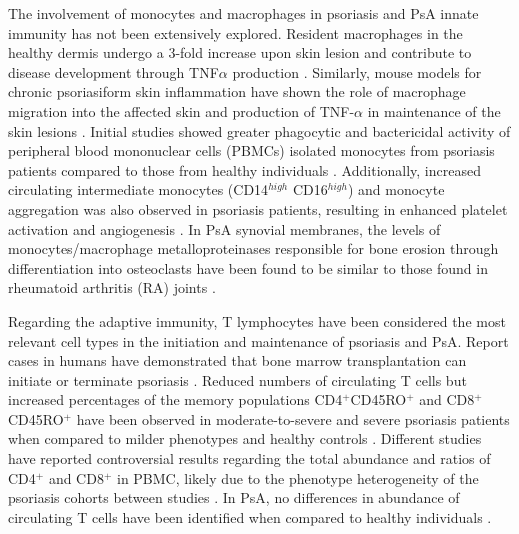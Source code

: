 %
%


The involvement of monocytes and macrophages in psoriasis and PsA innate immunity has not been extensively explored. Resident macrophages in the healthy dermis undergo a 3-fold increase upon skin lesion and contribute to disease development through TNF$\alpha$ production \parencite{Perera2012, Mahil2016}. Similarly, mouse models for chronic psoriasiform skin inflammation have shown the role of macrophage migration into the affected skin and production of TNF-$\alpha$ in maintenance of the skin lesions \parencite{Stratis2006, Wang2006}. Initial studies showed greater phagocytic and bactericidal activity of peripheral blood mononuclear cells (PBMCs) isolated monocytes from psoriasis patients compared to those from healthy individuals \parencite{Bar-Eli1979}. Additionally, increased circulating intermediate monocytes (CD14$^{high}$ CD16$^{high}$) and monocyte aggregation was also observed in psoriasis patients, resulting in enhanced platelet activation and angiogenesis \parencite {Golden2015}. In PsA synovial membranes, the levels of monocytes/macrophage metalloproteinases responsible for bone erosion through differentiation into osteoclasts  have been found to be similar to those found in rheumatoid arthritis (RA) joints \parencite{Hitchon2002}. 

Regarding the adaptive immunity, T lymphocytes have been considered the most relevant cell types in the initiation and maintenance of psoriasis and PsA. Report cases in humans have demonstrated that bone marrow transplantation can initiate or terminate psoriasis \parencite{Eedy1990, Gardembas1990}. Reduced numbers of circulating T cells but increased percentages of the memory populations CD4$^+$CD45RO$^+$ and CD8$^+$CD45RO$^+$ have been observed in moderate-to-severe and severe psoriasis patients when compared to milder phenotypes and healthy controls \parencite{Lecewicz-Toruń2001,Langewouters2008}. Different studies have reported controversial results regarding the total abundance and ratios of CD4$^+$ and CD8$^{+}$ in PBMC, likely due to the phenotype heterogeneity of the psoriasis cohorts between studies \parencite{Lecewicz-Toruń2001,Cameron2003,Langewouters2008}. In PsA, no differences in abundance of circulating T cells have been identified when compared to healthy individuals \parencite{Costello1999}.

